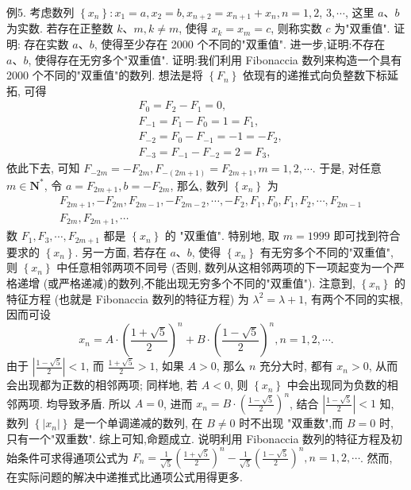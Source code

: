 例5. 考虑数列 $\left\{x_n\right\}: x_1=a, x_2=b, x_{n+2}=x_{n+1}+x_n, n=1,2$, $3, \cdots$, 这里 $a 、 b$ 为实数.
若存在正整数 $k 、 m, k \neq m$, 使得 $x_k=x_m=c$, 则称实数 $c$ 为"双重值". 证明: 存在实数 $a 、 b$, 使得至少存在 2000 个不同的"双重值". 进一步,证明:不存在 $a 、 b$, 使得存在无穷多个"双重值".
证明:我们利用 Fibonaccia 数列来构造一个具有 2000 个不同的"双重值"的数列.
想法是将 $\left\{F_n\right\}$ 依现有的递推式向负整数下标延拓, 可得
$$
\begin{aligned}
& F_0=F_2-F_1=0, \\
& F_{-1}=F_1-F_0=1=F_1, \\
& F_{-2}=F_0-F_{-1}=-1=-F_2, \\
& F_{-3}=F_{-1}-F_{-2}=2=F_3,
\end{aligned}
$$
依此下去, 可知 $F_{-2 m}=-F_{2 m}, F_{-(2 m+1)}=F_{2 m+1}, m=1,2, \cdots$.
于是, 对任意 $m \in \mathbf{N}^*$, 令 $a=F_{2 m+1}, b=-F_{2 m}$, 那么, 数列 $\left\{x_n\right\}$ 为
$$
\begin{aligned}
& F_{2 m+1},-F_{2 m}, F_{2 m-1},-F_{2 m-2}, \cdots,-F_2, F_1, F_0, F_1, F_2, \cdots, F_{2 m-1} \\
& F_{2 m}, F_{2 m+1}, \cdots
\end{aligned}
$$
数 $F_1, F_3, \cdots, F_{2 m+1}$ 都是 $\left\{x_n\right\}$ 的 "双重值". 特别地, 取 $m=1999$ 即可找到符合要求的 $\left\{x_n\right\}$.
另一方面, 若存在 $a 、 b$, 使得 $\left\{x_n\right\}$ 有无穷多个不同的"双重值", 则 $\left\{x_n\right\}$ 中任意相邻两项不同号 (否则, 数列从这相邻两项的下一项起变为一个严格递增 (或严格递减)的数列,不能出现无穷多个不同的"双重值").
注意到, $\left\{x_n\right\}$ 的特征方程 (也就是 Fibonaccia 数列的特征方程) 为 $\lambda^2= \lambda+1$, 有两个不同的实根, 因而可设
$$
x_n=A \cdot\left(\frac{1+\sqrt{5}}{2}\right)^n+B \cdot\left(\frac{1-\sqrt{5}}{2}\right)^n, n=1,2, \cdots .
$$
由于 $\left|\frac{1-\sqrt{5}}{2}\right|<1$, 而 $\frac{1+\sqrt{5}}{2}>1$, 如果 $A>0$, 那么 $n$ 充分大时, 都有 $x_n>0$, 从而会出现都为正数的相邻两项; 同样地, 若 $A<0$, 则 $\left\{x_n\right\}$ 中会出现同为负数的相邻两项.
均导致矛盾.
所以 $A=0$, 进而 $x_n=B \cdot\left(\frac{1-\sqrt{5}}{2}\right)^n$, 结合 $\left|\frac{1-\sqrt{5}}{2}\right|<1$ 知, 数列 $\left\{\left|x_n\right|\right\}$ 是一个单调递减的数列, 在 $B \neq 0$ 时不出现 "双重数",而 $B=0$ 时, 只有一个"双重数".
综上可知,命题成立.
说明利用 Fibonaccia 数列的特征方程及初始条件可求得通项公式为 $F_n=\frac{1}{\sqrt{5}}\left(\frac{1+\sqrt{5}}{2}\right)^n-\frac{1}{\sqrt{5}}\left(\frac{1-\sqrt{5}}{2}\right)^n, n=1,2, \cdots$. 然而, 在实际问题的解决中递推式比通项公式用得更多.



